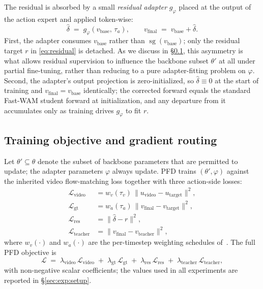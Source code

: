 \documentclass{article}
\begin{document}
The residual is absorbed by a small \emph{residual adapter} $g_\varphi$ placed at the output of the action expert and applied token-wise:
\begin{equation}
\hat{\delta} \;=\; g_\varphi\!\left(v_\mathrm{base},\, \tau_a\right), \qquad v_\mathrm{final} \;=\; v_\mathrm{base} + \hat{\delta}.
\label{eq:adapter}
\end{equation}
First, the adapter consumes $v_\mathrm{base}$ rather than $\operatorname{sg}(v_\mathrm{base})$; only the residual target $r$ in \eqref{eq:residual} is detached. As we discuss in \S\ref{sec:method:loss}, this asymmetry is what allows residual supervision to influence the backbone subset $\theta'$ at all under partial fine-tuning, rather than reducing to a pure adapter-fitting problem on $\varphi$. Second, the adapter's output projection is zero-initialized, so $\hat{\delta} \equiv 0$ at the start of training and $v_\mathrm{final} = v_\mathrm{base}$ identically; the corrected forward equals the standard Fast-WAM student forward at initialization, and any departure from it accumulates only as training drives $g_\varphi$ to fit $r$.

\subsection{Training objective and gradient routing}
\label{sec:method:loss}

Let $\theta' \subseteq \theta$ denote the subset of backbone parameters that are permitted to update; the adapter parameters $\varphi$ always update. PFD trains $(\theta', \varphi)$ against the inherited video flow-matching loss together with three action-side losses:
\begin{align}
\mathcal{L}_\mathrm{video}   &= w_v(\tau_v)\,\bigl\lVert u_\mathrm{video} - u_\mathrm{target} \bigr\rVert^2, \label{eq:loss-video}\\
\mathcal{L}_\mathrm{gt}      &= w_a(\tau_a)\,\bigl\lVert v_\mathrm{final} - v_\mathrm{target} \bigr\rVert^2, \label{eq:loss-gt}\\
\mathcal{L}_\mathrm{res}     &= \bigl\lVert \hat{\delta} - r \bigr\rVert^2, \label{eq:loss-res}\\
\mathcal{L}_\mathrm{teacher} &= \bigl\lVert v_\mathrm{final} - v_\mathrm{teacher} \bigr\rVert^2, \label{eq:loss-teacher}
\end{align}
where $w_v(\cdot)$ and $w_a(\cdot)$ are the per-timestep weighting schedules of~\citet{yuan2026fastwam}. The full PFD objective is
\begin{equation}
\mathcal{L} \;=\; \lambda_\mathrm{video}\,\mathcal{L}_\mathrm{video} \;+\; \lambda_\mathrm{gt}\,\mathcal{L}_\mathrm{gt} \;+\; \lambda_\mathrm{res}\,\mathcal{L}_\mathrm{res} \;+\; \lambda_\mathrm{teacher}\,\mathcal{L}_\mathrm{teacher},
\label{eq:total}
\end{equation}
with non-negative scalar coefficients; the values used in all experiments are reported in \S\ref{sec:exp:setup}.
\end{document}
